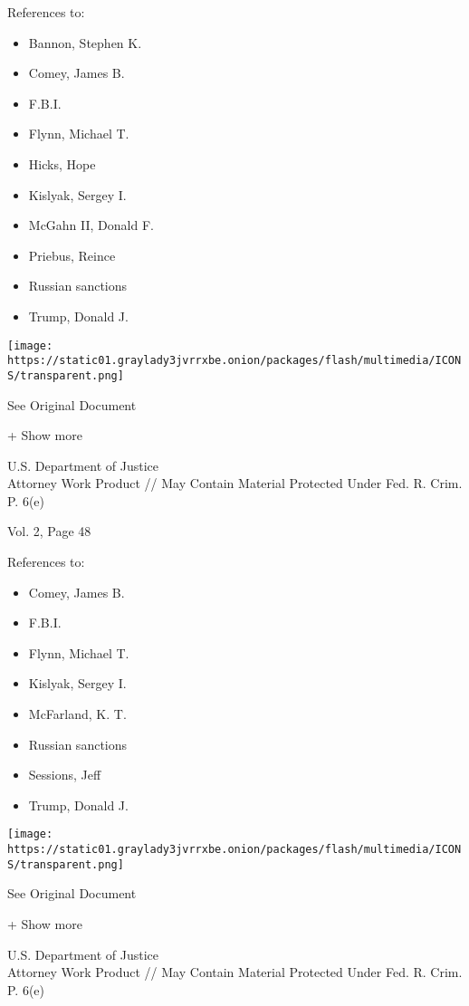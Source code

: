 References to:

\begin{itemize}
\tightlist
\item
  Bannon, Stephen K.
\item
  Comey, James B.
\item
  F.B.I.
\item
  Flynn, Michael T.
\item
  Hicks, Hope
\item
  Kislyak, Sergey I.
\item
  McGahn II, Donald F.
\item
  Priebus, Reince
\item
  Russian sanctions
\item
  Trump, Donald J.
\end{itemize}

\protect\hyperlink{}{}

\texttt{[image: https://static01.graylady3jvrrxbe.onion/packages/flash/multimedia/ICONS/transparent.png]}

See Original Document

+ Show more

U.S. Department of Justice\\
Attorney Work Product // May Contain Material Protected Under Fed. R.
Crim. P. 6(e)

Vol. 2, Page 48

References to:

\begin{itemize}
\tightlist
\item
  Comey, James B.
\item
  F.B.I.
\item
  Flynn, Michael T.
\item
  Kislyak, Sergey I.
\item
  McFarland, K. T.
\item
  Russian sanctions
\item
  Sessions, Jeff
\item
  Trump, Donald J.
\end{itemize}

\protect\hyperlink{}{}

\texttt{[image: https://static01.graylady3jvrrxbe.onion/packages/flash/multimedia/ICONS/transparent.png]}

See Original Document

+ Show more

U.S. Department of Justice\\
Attorney Work Product // May Contain Material Protected Under Fed. R.
Crim. P. 6(e)


